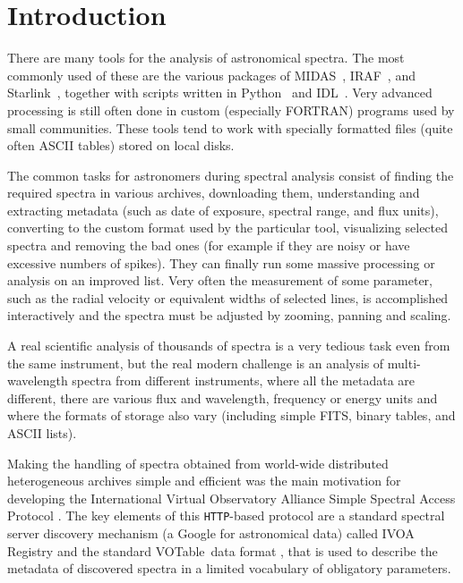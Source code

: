 \documentclass[final,authoryear,5p,times,twocolumn]{elsarticle}
\newcommand{\ssap}{\texttt{SSAP}}
\newcommand{\votable}{VOTable}
\newcommand{\IRAF}{\textsf{\small IRAF}}
\newcommand{\IDL}{\textsf{\small IDL}}
\newcommand{\python}{\textsf{\small Python}}
\newcommand{\Starlink}{\textsf{\small Starlink}}
\newcommand{\ascl}[1]{\href{http://www.ascl.net/#1}{ascl:#1}}
\begin{document}
\section{Introduction}

There are many tools for the analysis of astronomical spectra.  The most
commonly used of these are the various packages of MIDAS\
\citep[][\ascl{1302.017}]{1992ASPC...25..115W}, \IRAF\
\citep[][\ascl{9911.002}]{2012ASPC..461..595F}, and \Starlink\
\citep[][\ascl{1110.012}]{1982QJRAS..23..485D}, together with scripts written
in \python\ \citep[e.g.,][]{2013A&A...558A..33A} and \IDL\
\citep[e.g.,][]{1993ASPC...52..246L}.  Very advanced processing is still often
done in custom (especially FORTRAN) programs used by small communities.  These
tools tend to work with specially formatted files (quite often ASCII tables)
stored on local disks.

The common tasks for astronomers during spectral analysis consist of finding
the required spectra in various archives, downloading them, understanding and
extracting metadata (such as date of exposure, spectral range, and flux units),
converting to the custom format used by the particular tool, visualizing
selected spectra and  removing the bad ones (for example if they are noisy or
have excessive numbers of spikes). They can finally run some massive processing
or analysis on an improved list.  Very often the measurement of some parameter,
such as the radial velocity or equivalent widths of selected lines, is
accomplished interactively and the spectra must be adjusted by zooming, panning
and scaling.

A real scientific analysis of thousands of spectra is a very tedious task even
from the same instrument, but the real modern challenge is an analysis of
multi-wavelength spectra from different instruments, where all the metadata are
different, there are various flux and wavelength, frequency or energy units
and where the formats of storage also vary (including simple FITS, binary
tables, and ASCII lists).

Making the handling of spectra obtained from world-wide distributed
heterogeneous archives simple and efficient was the main motivation for
developing the International Virtual Observatory Alliance Simple Spectral
Access Protocol \citep[IVOA \ssap;][]{ssap}. The key elements of this
\texttt{HTTP}-based protocol are a standard spectral server discovery mechanism
(a Google for astronomical data) called IVOA Registry \citep{registry} and  the
standard \votable\ data format \citep{2004tivo.conf..118O}, that is used to
describe the metadata of discovered spectra in a limited vocabulary of
obligatory parameters.
\end{document}
